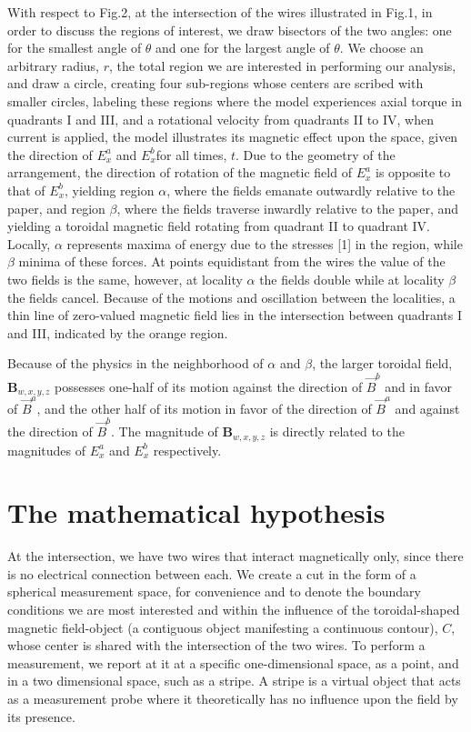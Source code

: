 \documentclass[]{article}
\begin{document}
With respect to Fig.2, at the intersection of the wires illustrated in Fig.1, in order to discuss the regions of interest, we draw bisectors of the two angles: one for the smallest angle of $\theta$ and one for the largest angle of $\theta$. We choose an arbitrary radius, $r$, the total region we are interested in performing our analysis, and draw a circle, creating four sub-regions whose centers are scribed with smaller circles, labeling these regions where the model experiences axial torque in quadrants I and III, and a rotational velocity from quadrants II to IV, when current is applied, the model illustrates its magnetic effect upon the space, given the direction of $E_{x}^{a}$ and $E_{x}^{b}$for all times, $t$. Due to the geometry of the arrangement, the direction of rotation of the magnetic field of $E_{x}^{a}$ is opposite to that of $E_{x}^{b}$, yielding region $\alpha$, where the fields emanate outwardly relative to the paper, and region $\beta$, where the fields traverse inwardly relative to the paper, and yielding a toroidal magnetic field rotating from quadrant II to quadrant IV. Locally, $\alpha$ represents maxima of energy due to the stresses [1] in the region, while $\beta$ minima of these forces. At points equidistant from the wires the value of the two fields is the same, however, at locality $\alpha$ the fields double while at locality $\beta$ the fields cancel. Because of the motions and oscillation between the localities, a thin line of zero-valued magnetic field lies in the intersection between quadrants I and III, indicated by the orange region.

Because of the physics in the neighborhood of $\alpha$ and $\beta$, the larger toroidal field, ${{\mathbf{B}}_{w,x,y,z}}$ possesses one-half of its motion against the direction of ${{\vec{B}}^{b}}$ and in favor of ${{\vec{B}}^{a}}$, and the other half of its motion in favor of the direction of ${{\vec{B}}^{a}}$ and against the direction of ${{\vec{B}}^{b}}$. The magnitude of ${{\mathbf{B}}_{w,x,y,z}}$ is directly related to the magnitudes of $E_{x}^{a}$ and $E_{x}^{b}$ respectively.

\section{The mathematical hypothesis}
At the intersection, we have two wires that interact magnetically only, since there is no electrical connection between each. We create a cut in the form of a spherical measurement space, for convenience and to denote the boundary conditions we are most interested and within the influence of the toroidal-shaped magnetic field-object (a contiguous object manifesting a continuous contour), $C$, whose center is shared with the intersection of the two wires. To perform a measurement, we report at it at a specific one-dimensional space, as a point, and in a two dimensional space, such as a stripe. A stripe is a virtual object that acts as a measurement probe where it theoretically has no influence upon the field by its presence.
\end{document}
